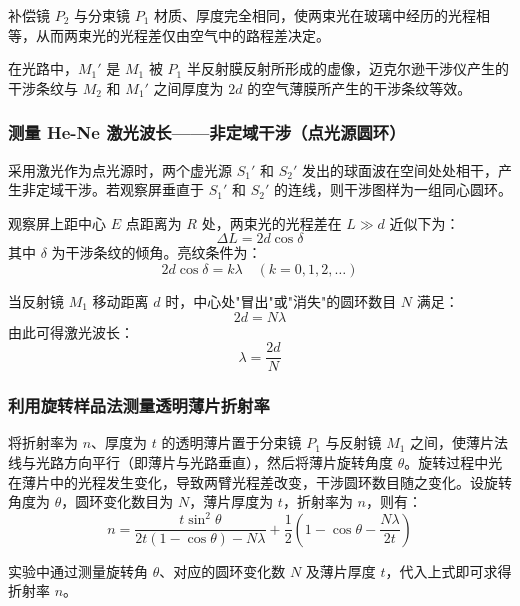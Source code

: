 \documentclass[dvipsnames, svgnames,a4paper,11pt]{article}
\begin{document}
补偿镜 $P_2$ 与分束镜 $P_1$ 材质、厚度完全相同，使两束光在玻璃中经历的光程相等，从而两束光的光程差仅由空气中的路程差决定。

在光路中，$M_1'$ 是 $M_1$ 被 $P_1$ 半反射膜反射所形成的虚像，迈克尔逊干涉仪产生的干涉条纹与 $M_2$ 和 $M_1'$ 之间厚度为 $2d$ 的空气薄膜所产生的干涉条纹等效。

\subsubsection{测量 He-Ne 激光波长——非定域干涉（点光源圆环）}

采用激光作为点光源时，两个虚光源 $S_1'$ 和 $S_2'$ 发出的球面波在空间处处相干，产生非定域干涉。若观察屏垂直于 $S_1'$ 和 $S_2'$ 的连线，则干涉图样为一组同心圆环。

观察屏上距中心 $E$ 点距离为 $R$ 处，两束光的光程差在 $L \gg d$ 近似下为：
\begin{equation}
    \Delta L = 2d\cos\delta
\end{equation}
其中 $\delta$ 为干涉条纹的倾角。亮纹条件为：
\begin{equation}
    2d\cos\delta = k\lambda \quad (k = 0, 1, 2, \ldots)
\end{equation}

当反射镜 $M_1$ 移动距离 $d$ 时，中心处"冒出"或"消失"的圆环数目 $N$ 满足：
\begin{equation}
    2d = N\lambda
\end{equation}
由此可得激光波长：
\begin{equation}
    \lambda = \frac{2d}{N}
    \label{eq:wavelength}
\end{equation}


\subsubsection{利用旋转样品法测量透明薄片折射率}

将折射率为 $n$、厚度为 $t$ 的透明薄片置于分束镜 $P_1$ 与反射镜 $M_1$ 之间，使薄片法线与光路方向平行（即薄片与光路垂直），然后将薄片旋转角度 $\theta$。旋转过程中光在薄片中的光程发生变化，导致两臂光程差改变，干涉圆环数目随之变化。设旋转角度为 $\theta$，圆环变化数目为 $N$，薄片厚度为 $t$，折射率为 $n$，则有：
\begin{equation}
    n = \frac{t \sin^2\theta}{2t(1-\cos\theta) - N\lambda} + \frac{1}{2} \left( 1 - \cos\theta - \frac{N\lambda}{2t} \right)
    \label{eq:refraction}
\end{equation}

实验中通过测量旋转角 $\theta$、对应的圆环变化数 $N$ 及薄片厚度 $t$，代入上式即可求得折射率 $n$。
\clearpage
\end{document}
